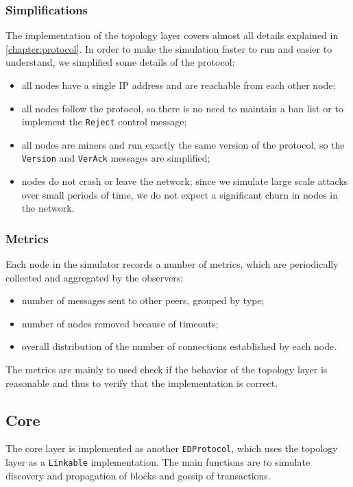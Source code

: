 \subsubsection{Simplifications}
The implementation of the topology layer covers almost all details explained in \cref{chapter:protocol}.
In order to make the simulation faster to run and easier to understand, we simplified some details of the protocol:
\begin{itemize}
	\item all nodes have a single IP address and are reachable from each other node;
	\item all nodes follow the protocol, so there is no need to maintain a ban list or to implement the \texttt{Reject} control message;
	\item all nodes are miners and run exactly the same version of the protocol, so the \texttt{Version} and \texttt{VerAck} messages are simplified;
	\item nodes do not crash or leave the network; since we simulate large scale attacks over small periods of time, we do not expect a significant churn in nodes in the network.
\end{itemize}

\subsubsection{Metrics}
Each node in the simulator records a number of metrics, which are periodically collected and aggregated by the observers:
\begin{itemize}
	\item number of messages sent to other peers, grouped by type;
	\item number of nodes removed because of timeouts;
	\item overall distribution of the number of connections established by each node.
\end{itemize}
The metrics are mainly to used check if the behavior of the topology layer is reasonable and thus to verify that the implementation is correct.

\subsection{Core}
The core layer is implemented as another \texttt{EDProtocol}, which uses the topology layer as a \texttt{Linkable} implementation.
The main functions are to simulate discovery and propagation of blocks and gossip of transactions.


